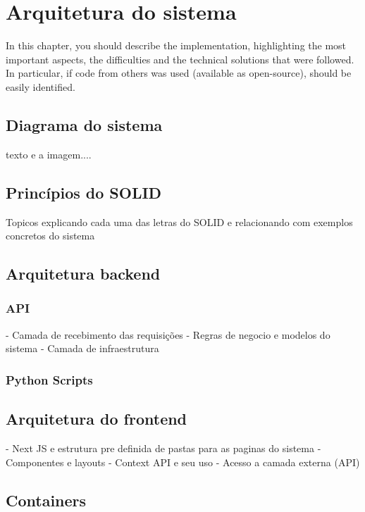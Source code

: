 \chapter{Arquitetura do sistema}\label{cap:development}

In this chapter, you should describe the implementation, highlighting the most important aspects, the difficulties and the technical solutions that were followed. In particular, if code from others was used (available as open-source), should be easily identified.

\section[Diagrama do sistema]{Diagrama do sistema}
texto e a imagem....

\section[Princípios do SOLID]{Princípios do SOLID}
Topicos explicando cada uma das letras do SOLID e relacionando com exemplos concretos do sistema


\section[Arquitetura do backend]{Arquitetura backend}

\subsection*{API}
- Camada de recebimento das requisições
- Regras de negocio e modelos do sistema
- Camada de infraestrutura

\subsection*{Python Scripts}


\section[Arquitetura do frontend]{Arquitetura do frontend}
- Next JS e estrutura pre definida de pastas para as paginas do sistema
- Componentes e layouts
- Context API e seu uso
- Acesso a camada externa (API)

\section{Containers}